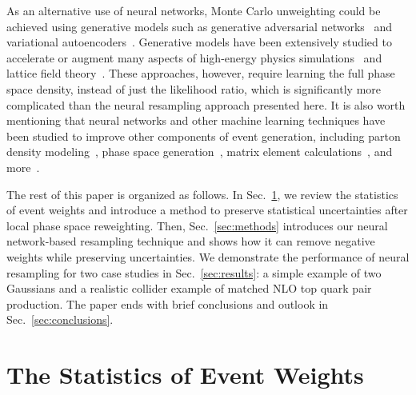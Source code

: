 \documentclass[prd,twocolumn,superscriptaddress,longbibliography,preprintnumbers,floatfix,nofootinbib]{revtex4-1}
\DeclareRobustCommand{\Sec}[1]{Sec.~\ref{sec:#1}}
\begin{document}
As an alternative use of neural networks, Monte Carlo unweighting could be achieved using generative models such as generative adversarial networks~\cite{Goodfellow:2014upx} and variational autoencoders~\cite{2013arXiv1312.6114K,2014arXiv1401.4082J}.
%
Generative models have been extensively studied to accelerate or augment many aspects of high-energy physics simulations~\cite{deOliveira:2017pjk,Paganini:2017hrr,Paganini:2017dwg,Alonso-Monsalve:2018aqs,Butter:2019eyo,Martinez:2019jlu,Bellagente:2019uyp,Vallecorsa:2019ked,SHiP:2019gcl,Carrazza:2019cnt,Butter:2019cae,Lin:2019htn,DiSipio:2019imz,Hashemi:2019fkn,Chekalina:2018hxi,ATL-SOFT-PUB-2018-001,Zhou:2018ill,Carminati:2018khv,Vallecorsa:2018zco,Datta:2018mwd,Musella:2018rdi,Erdmann:2018kuh,Deja:2019vcv,Derkach:2019qfk,Erbin:2018csv,Erdmann:2018jxd,Oliveira:DLPS2017,deOliveira:2017rwa,Farrell:2019fsm,Hooberman:DLPS2017,Belayneh:2019vyx,buhmann2020getting} and lattice field theory~\cite{Albergo:2019eim,Kanwar:2020xzo,Urban:2018tqv,Nicoli:2020njz}.
%
These approaches, however, require learning the full phase space density, instead of just the likelihood ratio, which is significantly more complicated than the neural resampling approach presented here.
%
It is also worth mentioning that neural networks and other machine learning techniques have been studied to improve other components of event generation, including parton density modeling~\cite{Ball:2017nwa,Carrazza:2019mzf}, phase space generation~\cite{Bendavid:2017zhk,Klimek:2018mza,Bothmann:2020ywa,Gao:2020vdv,Gao:2020zvv}, matrix element calculations~\cite{Bishara:2019iwh,Badger:2020uow}, and more~\cite{Monk:2018zsb,Andreassen:2019txo,Andreassen:2018apy}.



The rest of this paper is organized as follows.
%
In \Sec{stats}, we review the statistics of event weights and introduce a method to preserve statistical uncertainties after local phase space reweighting.  
%
Then, \Sec{methods} introduces our neural network-based resampling technique and shows how it can remove negative weights while preserving uncertainties.
%
We demonstrate the performance of neural resampling for two case studies in \Sec{results}:  a simple example of two Gaussians and a realistic collider example of matched NLO top quark pair production.
%
The paper ends with brief conclusions and outlook in \Sec{conclusions}.


\section{The Statistics of Event Weights}
\label{sec:stats}
\end{document}
